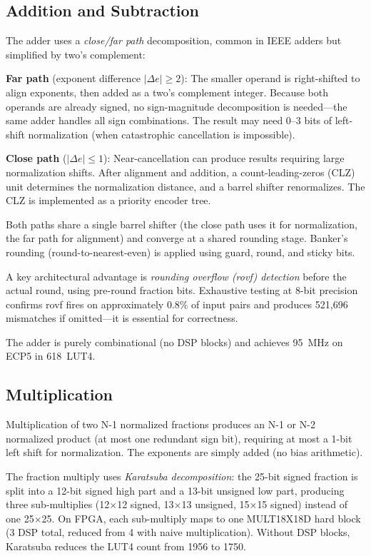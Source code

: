 \documentclass[10pt,twocolumn]{article}
\begin{document}
\subsection{Addition and Subtraction}
\label{sec:addsub}

The adder uses a \emph{close/far path} decomposition, common in IEEE
adders but simplified by two's complement:

\textbf{Far path} (exponent difference $|\Delta e| \geq 2$): The smaller
operand is right-shifted to align exponents, then added as a two's
complement integer.  Because both operands are already signed, no
sign-magnitude decomposition is needed---the same adder handles all sign
combinations.  The result may need 0--3 bits of left-shift normalization
(when catastrophic cancellation is impossible).

\textbf{Close path} ($|\Delta e| \leq 1$): Near-cancellation can
produce results requiring large normalization shifts.  After alignment
and addition, a count-leading-zeros (CLZ) unit determines the
normalization distance, and a barrel shifter renormalizes.  The CLZ is
implemented as a priority encoder tree.

Both paths share a single barrel shifter (the close path uses it for
normalization, the far path for alignment) and converge at a shared
rounding stage.  Banker's rounding (round-to-nearest-even) is applied
using guard, round, and sticky bits.

A key architectural advantage is \emph{rounding overflow (rovf)
detection} before the actual round, using pre-round fraction bits.
Exhaustive testing at 8-bit precision confirms rovf fires on
approximately 0.8\% of input pairs and produces 521,696 mismatches if
omitted---it is essential for correctness.

The adder is purely combinational (no DSP blocks) and achieves 95~MHz
on ECP5 in 618~LUT4.

\subsection{Multiplication}
\label{sec:mul}

Multiplication of two N-1 normalized fractions produces an N-1 or N-2
normalized product (at most one redundant sign bit), requiring at most
a 1-bit left shift for normalization.  The exponents are simply added
(no bias arithmetic).

The fraction multiply uses \emph{Karatsuba decomposition}: the 25-bit
signed fraction is split into a 12-bit signed high part and a 13-bit
unsigned low part, producing three sub-multiplies (12$\times$12 signed,
13$\times$13 unsigned, 15$\times$15 signed) instead of one 25$\times$25.
On FPGA, each sub-multiply maps to one MULT18X18D hard block (3 DSP
total, reduced from 4 with naive multiplication).  Without DSP blocks,
Karatsuba reduces the LUT4 count from 1956 to 1750.
\end{document}
